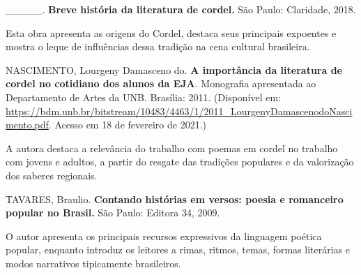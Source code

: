 \documentclass{extarticle}
\begin{document}
  \_\_\_\_\_. \textbf{Breve história da literatura de cordel.} São
  Paulo: Claridade, 2018.

Esta obra apresenta as origens do Cordel, destaca seus principais
expoentes e mostra o leque de influências dessa tradição na cena
cultural brasileira.


  NASCIMENTO, Lourgeny Damasceno do. \textbf{A importância da literatura
  de cordel no cotidiano dos alunos da EJA}. Monografia apresentada ao
  Departamento de Artes da UNB. Brasília: 2011. (Disponível em:
  \url{https://bdm.unb.br/bitstream/10483/4463/1/2011_LourgenyDamascenodoNascimento.pdf}.
  Acesso em 18 de fevereiro de 2021.)

A autora destaca a relevância do trabalho com poemas em cordel no
trabalho com jovens e adultos, a partir do resgate das tradições
populares e da valorização dos saberes regionais.


  TAVARES, Braulio. \textbf{Contando histórias em versos: poesia e
  romanceiro popular no Brasil.} São Paulo: Editora 34, 2009.

O autor apresenta os principais recursos expressivos da linguagem
poética popular, enquanto introduz os leitores a rimas, ritmos, temas,
formas literárias e modos narrativos tipicamente brasileiros.
\end{document}
